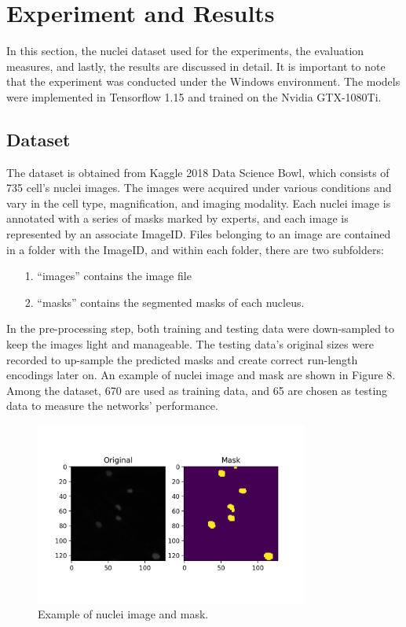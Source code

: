 \documentclass{article}
\begin{document}
\section{Experiment and Results}
In this section, the nuclei dataset used for the experiments, the evaluation measures, and lastly, the results are discussed in detail. It is important to note that the experiment was conducted under the Windows environment. The models were implemented in Tensorflow 1.15 and trained on the Nvidia GTX-1080Ti.

\subsection{Dataset}
The dataset is obtained from Kaggle 2018 Data Science Bowl\cite{kaggle_2018}, which consists of 735 cell's nuclei images. The images were acquired under various conditions and vary in the cell type, magnification, and imaging modality. Each nuclei image is annotated with a series of masks marked by experts, and each image is represented by an associate ImageID. Files belonging to an image are contained in a folder with the ImageID, and within each folder, there are two subfolders:

\begin{itemize}
    \item[1.]“images” contains the image file
    \item[2.]“masks” contains the segmented masks of each nucleus.
\end{itemize}

In the pre-processing step, both training and testing data were down-sampled to keep the images light and manageable. The testing data's original sizes were recorded to up-sample the predicted masks and create correct run-length encodings later on. An example of nuclei image and mask are shown in Figure 8. Among the dataset, 670 are used as training data, and 65 are chosen as testing data to measure the networks' performance.

\begin{figure}[H]
    \centering
    \includegraphics[width=9cm]{OrignalMask}
    \caption{Example of nuclei image and mask.}
    \label{Example of nuclei image and mask.}
\end{figure}
\end{document}
